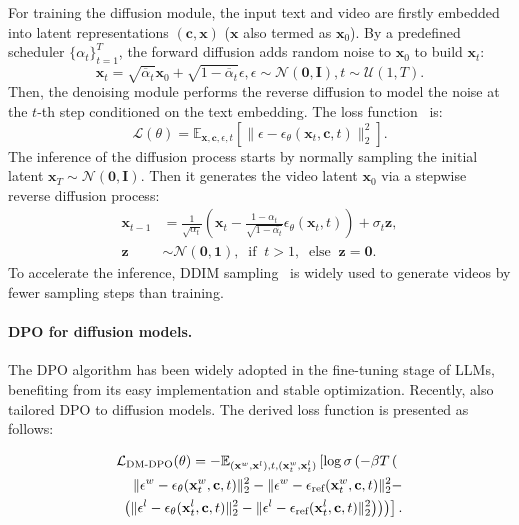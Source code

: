For training the diffusion module, the input text and video are firstly embedded into latent representations $(\mathbf{c}, \mathbf{x})$ ($\mathbf{x}$ also termed as $\mathbf{x}_0$). By a predefined scheduler $\{\alpha_t\}_{t=1}^T$, the forward diffusion adds random noise to $\mathbf{x}_0$ to build $\mathbf{x}_t$: 
\begin{equation}%
     \mathbf{x}_t = \sqrt{\overline{\alpha}_t}\mathbf{x}_0 + \sqrt{1-\overline{\alpha}_t}\epsilon, \epsilon\sim\mathcal{N}(\mathbf{0},\mathbf{I}),t\sim\mathcal{U}(1,T).
\end{equation}
Then, the denoising module performs the reverse diffusion to model the noise at the $t$-th step conditioned on the text embedding. The loss function~\cite{DM2} is:
\begin{equation}%
    \mathcal{L}(\theta) = \mathbb{E}_{\mathbf{x}, \mathbf{c}, \epsilon, t}\left[\|\epsilon - \epsilon_\theta(\mathbf{x}_t, \mathbf{c}, t) \|^2_2\right].
\end{equation}
The inference of the diffusion process starts by normally sampling the initial latent $\mathbf{x}_T\sim\mathcal{N}(\mathbf{0},\mathbf{I})$. Then it generates the video latent $\mathbf{x}_0$ via a stepwise reverse diffusion process: 
\begin{align}
    \mathbf{x}_{t-1} &= \frac{1}{\sqrt{\alpha_t}}(\mathbf{x}_t-\frac{1-\alpha_t}{\sqrt{1-\overline{\alpha_t}}}\epsilon_\theta(\mathbf{x}_t, t))+\sigma_t\mathbf{z}, \nonumber\\
    \mathbf{z}&\sim\mathcal{N}(\mathbf{0},\mathbf{1}), \;\;\text{if}\;\; t>1, \;\;\text{else}\;\; \mathbf{z}=\mathbf{0}.
\end{align}
To accelerate the inference, DDIM sampling~\cite{DDIM} is widely used to generate videos by fewer sampling steps than training.

\paragraph{DPO for diffusion models.}
The DPO algorithm has been widely adopted in the fine-tuning stage of LLMs, benefiting from its easy implementation and stable optimization. Recently, \citet{DPODM} also tailored DPO to diffusion models. The derived loss function is presented as follows:

\begin{align}
\small
    \mathcal{L}_{\text{DM-DPO}}(\theta) = -\mathbb{E}_{(\mathbf{x}^w,\mathbf{x}^l),t,(\mathbf{x}_t^w,\mathbf{x}_t^l)}\left[
    \log \sigma \left(
    -\beta T\left( \nonumber \right.\right.\right.\\ 
    \|\epsilon^w-\epsilon_\theta(\mathbf{x}^w_t ,\mathbf{c},t) \|^2_2-
    \|\epsilon^w-\epsilon_{\text{ref}}(\mathbf{x}^w_t,\mathbf{c},t) \|^2_2-\nonumber \\ \left.\left.\left.
    \left(
    \|\epsilon^l-\epsilon_\theta(\mathbf{x}^l_t ,\mathbf{c},t) \|^2_2-
    \|\epsilon^l-\epsilon_{\text{ref}}(\mathbf{x}^l_t,\mathbf{c},t) \|^2_2
    \right)
    \right) 
    \right) 
    \right].
\label{eq:diffusion_dpo}
\end{align}

